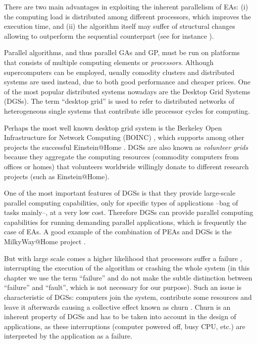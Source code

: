 \documentclass[graybox]{sty/svmult}
\begin{document}
There are two main advantages in
 exploiting the inherent parallelism of EAs: (i) the computing load is distributed among different processors, which improves the
execution time, and (ii) the algorithm itself may suffer of structural changes allowing to outperform the sequential counterpart
(see for instance \cite{spatially-structured-EAs}).

Parallel algorithms, and thus parallel GAs and GP, must be run on platforms that consists of multiple computing elements or \emph{processors}. Although supercomputers can be employed, usually comodity clusters and distributed systems are used instead, due to both good performance and cheaper prices.  One of the most popular distributed systems nowadays are the  Desktop Grid Systems (DGSs). 
The term ``desktop grid'' is used to refer to distributed networks of
heterogeneous single systems that contribute idle processor cycles for computing. 

Perhaps the most well known desktop grid system is the Berkeley Open Infrastructure for Network Computing (BOINC) \cite{boinc-paper}, 
which supports among other projects the successful Einstein@Home \cite{einsteinathome-2} . DGSs are also known as \emph{volunteer grids} because they
aggregate the computing resources (commodity computers from offices or homes) that volunteers worldwide willingly donate to different research 
projects (such as Einstein@Home). 

One of the most important features of DGSs is that they provide large-scale parallel computing capabilities, only for specific
types of applications --bag of tasks mainly--, at a very low cost. Therefore DGSs can provide parallel computing capabilities for running demanding parallel applications, which is frequently the case of EAs.  A good example of the combination of PEAs and DGSs
 is the MilkyWay@Home project \cite{milkywayathome}. 


But with large scale comes a higher 
likelihood that processors suffer a failure \cite{largescale_failures}, interrupting the execution of the algorithm or crashing the whole system (in this 
chapter we use the term ``failure'' and do not make the subtle distinction between ``failure'' and ``fault'', which
is not necessary for our purpose). 
Such an issue is characteristic of DGSs: computers join the system,
contribute some resources and leave it afterwards causing a collective effect known as churn \cite{Stutzbach06Understanding}.
Churn is an inherent property of DGSs and has to be taken into 
account in the design of applications, as these interruptions (computer powered off, busy CPU, etc.) are interpreted by the application as a failure.   
\end{document}
